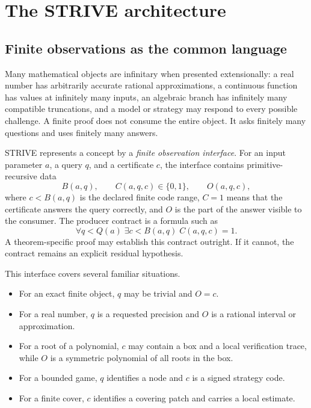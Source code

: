 \section{The STRIVE architecture}

\subsection{Finite observations as the common language}

Many mathematical objects are infinitary when presented extensionally: a real
number has arbitrarily accurate rational approximations, a continuous function
has values at infinitely many inputs, an algebraic branch has infinitely many
compatible truncations, and a model or strategy may respond to every possible
challenge.  A finite proof does not consume the entire object.  It asks finitely
many questions and uses finitely many answers.

STRIVE represents a concept by a \emph{finite observation interface}.  For an
input parameter \(a\), a query \(q\), and a certificate \(c\), the interface
contains primitive-recursive data
\[
 B(a,q),\qquad C(a,q,c)\in\{0,1\},\qquad O(a,q,c),
\]
where \(c<B(a,q)\) is the declared finite code range, \(C=1\) means that the
certificate answers the query correctly, and \(O\) is the part of the answer
visible to the consumer.  The producer contract is a formula such as
\[
  \forall q<Q(a)\;\exists c<B(a,q)\; C(a,q,c)=1.
\]
A theorem-specific proof may establish this contract outright.  If it cannot,
the contract remains an explicit residual hypothesis.

This interface covers several familiar situations.

\begin{itemize}
\item For an exact finite object, \(q\) may be trivial and \(O=c\).
\item For a real number, \(q\) is a requested precision and \(O\) is a rational
interval or approximation.
\item For a root of a polynomial, \(c\) may contain a box and a local
verification trace, while \(O\) is a symmetric polynomial of all roots in the
box.
\item For a bounded game, \(q\) identifies a node and \(c\) is a signed
strategy code.
\item For a finite cover, \(c\) identifies a covering patch and carries a
local estimate.
\end{itemize}

